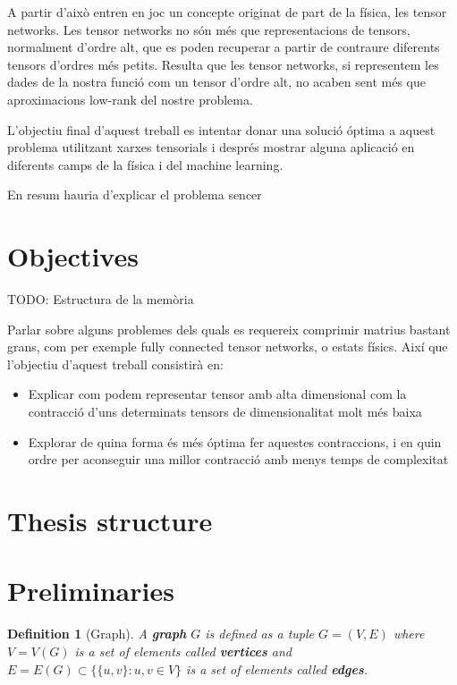 \documentclass[11pt,a4paper,openright,oneside]{book}
\numberwithin{equation}{section}
\newtheorem{defn0}{Definition}[chapter]
\newenvironment{definition}{ \begin{defn0}}{\end{defn0}}
\begin{document}
A partir d'això entren en joc un concepte originat de part de la física, les tensor networks. Les tensor networks no són més
que representacions de tensors, normalment d'ordre alt, que es poden recuperar a partir de contraure diferents tensors d'ordres més
petits. Resulta que les tensor networks, si representem les dades de la nostra funció com un tensor d'ordre alt, no acaben sent més que
aproximacions low-rank del nostre problema.

L'objectiu final d'aquest treball es intentar donar una solució óptima a aquest problema utilitzant xarxes tensorials i després mostrar
alguna aplicació en diferents camps de la física i del machine learning.

En resum hauria d'explicar el problema sencer

\section{Objectives}

TODO: Estructura de la memòria

Parlar sobre alguns problemes dels quals es requereix comprimir matrius bastant grans, com per exemple
fully connected tensor networks, o estats físics. Així que l'objectiu d'aquest treball consistirà en:

\begin{itemize}
    \item Explicar com podem representar tensor amb alta dimensional com la contracció d'uns determinats tensors de dimensionalitat molt més baixa
    \item Explorar de quina forma és més óptima fer aquestes contraccions, i en quin ordre per aconseguir una millor contracció amb menys temps de complexitat
\end{itemize}

\section{Thesis structure}

\section{Preliminaries}


\begin{definition}[Graph]
    A \textbf{graph} $G$ is defined as a tuple $G = (V,E)$ where $V = V(G)$ is a set of elements called \textbf{vertices} and 
    $E = E(G) \subset \{\{u, v\} : u, v \in V\}$ is a set of elements called \textbf{edges}.
\end{definition}
\end{document}
